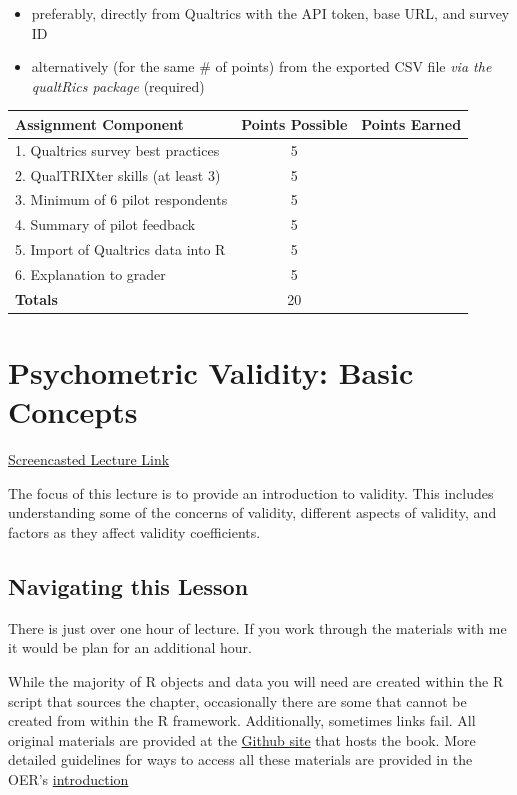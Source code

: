 \documentclass[
  english,
]{book}
\providecommand{\tightlist}{%
  \setlength{\itemsep}{0pt}\setlength{\parskip}{0pt}}
\begin{document}
\begin{itemize}
  \begin{itemize}
  \tightlist
  \item
    preferably, directly from Qualtrics with the API token, base URL, and survey ID
  \item
    alternatively (for the same \# of points) from the exported CSV file \emph{via the qualtRics package} (required)
  \end{itemize}
\end{itemize}

\begin{longtable}[]{@{}lcc@{}}
\toprule
Assignment Component & Points Possible & Points Earned\tabularnewline
\midrule
\endhead
1. Qualtrics survey best practices & 5 &\tabularnewline
2. QualTRIXter skills (at least 3) & 5 &\tabularnewline
3. Minimum of 6 pilot respondents & 5 &\tabularnewline
4. Summary of pilot feedback & 5 &\tabularnewline
5. Import of Qualtrics data into R & 5 &\tabularnewline
6. Explanation to grader & 5 &\tabularnewline
\textbf{Totals} & 20 &\tabularnewline
\bottomrule
\end{longtable}

\hypertarget{rxy}{%
\chapter{Psychometric Validity: Basic Concepts}\label{rxy}}

\href{https://spu.hosted.panopto.com/Panopto/Pages/Viewer.aspx?pid=d3b821d7-c182-435d-80ba-ad9e003dbc97}{Screencasted Lecture Link}

The focus of this lecture is to provide an introduction to validity. This includes understanding some of the concerns of validity, different aspects of validity, and factors as they affect validity coefficients.

\hypertarget{navigating-this-lesson-2}{%
\section{Navigating this Lesson}\label{navigating-this-lesson-2}}

There is just over one hour of lecture. If you work through the materials with me it would be plan for an additional hour.

While the majority of R objects and data you will need are created within the R script that sources the chapter, occasionally there are some that cannot be created from within the R framework. Additionally, sometimes links fail. All original materials are provided at the \href{https://github.com/lhbikos/ReC_Psychometrics}{Github site} that hosts the book. More detailed guidelines for ways to access all these materials are provided in the OER's \protect\hyperlink{ReCintro}{introduction}
\end{document}
